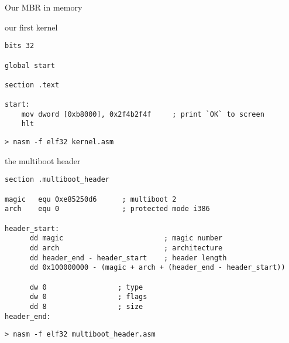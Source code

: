 \documentclass[aspectratio=169,12pt,handout]{beamer}
\begin{document}
\begin{frame}{Our MBR in memory}
  
\vspace{20pt}


\vspace{40pt}

\end{frame}


\begin{frame}[fragile]{our first kernel}

\begin{lstlisting}[language={[x86masm]Assembler}]
bits 32

global start

section .text

start:
	mov dword [0xb8000], 0x2f4b2f4f     ; print `OK` to screen
	hlt
\end{lstlisting}

\begin{verbatim}
> nasm -f elf32 kernel.asm
\end{verbatim}

  
\end{frame}

\begin{frame}[fragile]{the multiboot header}

\begin{lstlisting}
section .multiboot_header

magic   equ 0xe85250d6      ; multiboot 2
arch    equ 0               ; protected mode i386

header_start:
      dd magic                        ; magic number
      dd arch                         ; architecture
      dd header_end - header_start    ; header length 
      dd 0x100000000 - (magic + arch + (header_end - header_start))

      dw 0                 ; type
      dw 0                 ; flags
      dd 8                 ; size
header_end:
\end{lstlisting}

\begin{verbatim}
> nasm -f elf32 multiboot_header.asm 
\end{verbatim}

\end{frame}
\end{document}
